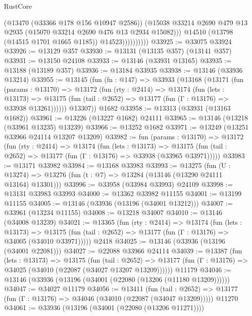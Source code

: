 \begin{lexlean}{RustCore}
\begin{coremodule}
                          (@13470 (@33366 @178 @156 @10947 @2586))
                          (@15038
                            @33214
                            @2690
                            @479
                            @13
                            @2935
                            (@15070 @33214 @2690 @476 @13 @2934 @15082)))
                        @14510
                        (@13798 (@14515 @1701 @1665 @1185))
                        @14523))))))))))
@33925 := @33075 @33924
@33926 := @13129 @357
@33930 := @13131 (@13135 @357) (@13141 @357)
@33931 := @13150 @24108
@33933 := @13146 (@33931 @13165)
@33935 := @13188 (@13189 @357)
@33936 := @13184 @33935
@33938 := @13146 (@33936 @13214)
@33955 := @13145
    (fun (fn : @147) =>
    @33933
      (@13168
        (@13171
          (fun (params : @13170) =>
          @13172
            (fun (rty : @2414) =>
            @13174
              (fun (lets : @13173) =>
              @13175 (fun (tail : @2652) => @13177 (fun (Γ : @13176) => @33938 @13261))))))
        @13307))
    @1682
@33958 := @13313 (@33931 (@13163 @1682))
@33961 := @13226 (@13227 @1682) @24111
@33965 := @13146 (@13218 (@33961 @13235) @13239)
@33966 := @13252 @1682
@33971 := @13249 (@13251 @33966 @24114 @13207 @13209)
@33982 := fun (params : @13170) =>
  @13172
    (fun (rty : @2414) =>
    @13174
      (fun (lets : @13173) =>
      @13175 (fun (tail : @2652) => @13177 (fun (Γ : @13176) => @33938 (@33965 @33971)))))
@33983 := @13171 @33982
@33984 := @13168 @33983
@33993 := @13275
    (fun (U : @13274) => @13276 (fun (t : @7) => @13284 (@13146 (@13290 @24111 @13164) @13301)))
@33996 := @33958 (@33984 @33993) @24109
@33998 := @13131 @33983 @33993
@34000 := @13362 @33982 @11155
@34001 := @13199 @11155
@34005 := @13146 (@33936 (@13196 (@34001 @13212)))
@34007 := @33961 (@13234 @11155)
@34008 := @13218 @34007
@34010 := @13146 (@34008 @13239)
@34021 := @13365
    (fun (rty : @2414) =>
    @13174
      (fun (lets : @13173) =>
      @13175 (fun (tail : @2652) => @13177 (fun (Γ : @13176) => @34005 (@34010 @33971)))))
    @2418
@34025 := @13146 (@33936 (@13196 (@34001 @22081)))
@34027 := @22088 @33966 @24114
@34039 := @13387
    (fun (lets : @13173) =>
    @13175
      (fun (tail : @2652) =>
      @13177 (fun (Γ : @13176) => @34025 (@34010 (@22087 (@34027 @13207 @13209))))))
    @11179
@34046 := @13146 (@33936 (@13196 (@34001 (@22080 (@13206 (@11180 @13209))))))
@34047 := @34027 @11179
@34056 := @13411
    (fun (tail : @2652) => @13177 (fun (Γ : @13176) => @34046 (@34010 (@22087 (@34047 @13209)))))
    @11270
@34061 := @33936 (@13196 (@34001 (@22080 (@13206 @11271))))

\end{coremodule}
\end{lexlean}
